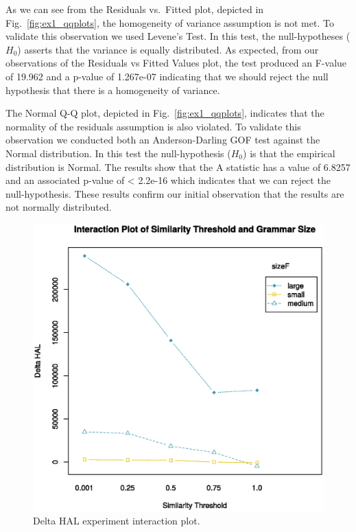 \documentclass[conference]{IEEEtran}
\begin{document}
As we can see from the Residuals vs.~Fitted plot, depicted in
Fig.~\ref{fig:ex1_qqplots}, the homogeneity of variance assumption is
not met. To validate this observation we used Levene's Test. In this
test, the null-hypotheses (\(H_0\)) asserts that the variance is equally
distributed. As expected, from our observations of the Residuals vs
Fitted Values plot, the test produced an F-value of 19.962 and a p-value
of 1.267e-07 indicating that we should reject the null hypothesis that
there is a homogeneity of variance.

The Normal Q-Q plot, depicted in Fig.~\ref{fig:ex1_qqplots}, indicates
that the normality of the residuals assumption is also violated. To
validate this observation we conducted both an Anderson-Darling GOF test
against the Normal distribution. In this test the null-hypothesis
(\(H_0\)) is that the empirical distribution is Normal. The results show
that the A statistic has a value of 6.8257 and an associated p-value of
\textless{} 2.2e-16 which indicates that we can reject the
null-hypothesis. These results confirm our initial observation that the
results are not normally distributed.

\begin{figure}
\hypertarget{fig:ex1_interaction}{%
\centering
\includegraphics{images/paper/results/ex1_interaction.eps}
\caption{Delta HAL experiment interaction
plot.}\label{fig:ex1_interaction}
}
\end{figure}
\end{document}
